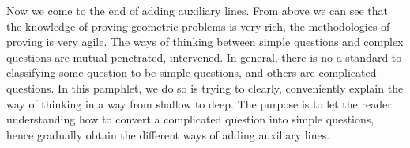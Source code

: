 \documentclass[12pt]{article}
\begin{document}
Now we come to the end of adding auxiliary lines. From above we can see that the knowledge of proving geometric problems is very rich, the methodologies of 
proving is very agile. The ways of thinking between simple questions and complex questions are mutual penetrated, intervened.  In general, there is no a standard to 
classifying some question to be simple questions, and others are complicated questions. In this pamphlet, we do so is trying to clearly, conveniently explain the way of thinking in a 
  way from shallow to deep. The purpose is to let the reader understanding how to convert a complicated question into simple questions, hence  gradually obtain the different ways of 
adding auxiliary lines.
\end{document}
